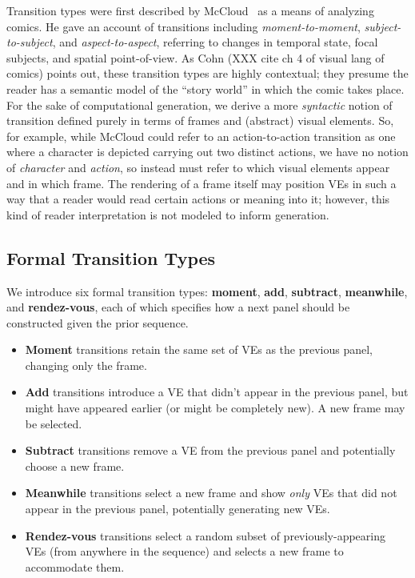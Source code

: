 Transition types were first described by
McCloud~\cite{mcCloud1993understanding} as a means of analyzing
comics. He gave an account of transitions including {\em moment-to-moment},
{\em subject-to-subject}, and {\em aspect-to-aspect}, referring to changes
in temporal state, focal subjects, and spatial point-of-view. As Cohn (XXX
cite ch 4 of visual lang of comics) points out, these transition types are
highly contextual; they presume the reader has a semantic model of the
``story world'' in which the comic takes place. For the sake of
computational generation, we derive a more {\em syntactic} notion of
transition defined purely in terms of frames and (abstract) visual
elements. So, for example, while McCloud could refer to an action-to-action
transition as one where a character is depicted carrying out two distinct
actions, we have no notion of {\em character} and {\em action}, so instead
must refer to which visual elements appear and in which frame. The
rendering of a frame itself may position VEs in such a way that a reader
would read certain actions or meaning into it; however, this kind of reader
interpretation is not modeled to inform generation.

\subsection{Formal Transition Types}

We introduce six formal transition types: {\bf moment}, {\bf add}, {\bf
subtract}, {\bf meanwhile}, and {\bf rendez-vous}, each of which specifies
how a next panel should be constructed given the prior sequence.

\begin{itemize}
\item {\bf Moment} transitions retain the same set of VEs as the previous panel, 
changing only the frame.

\item {\bf Add} transitions introduce a VE that didn't appear in the
previous panel, but might have appeared earlier (or might be completely
new). A new frame may be selected.

\item {\bf Subtract} transitions remove a VE from the previous panel and
potentially choose a new frame.

\item {\bf Meanwhile} transitions select a new frame and show {\em only}
VEs that did not appear in the previous panel, potentially generating new
VEs.

\item {\bf Rendez-vous} transitions select a random subset of
previously-appearing VEs (from anywhere in the sequence) and selects a new
frame to accommodate them.
\end{itemize}

